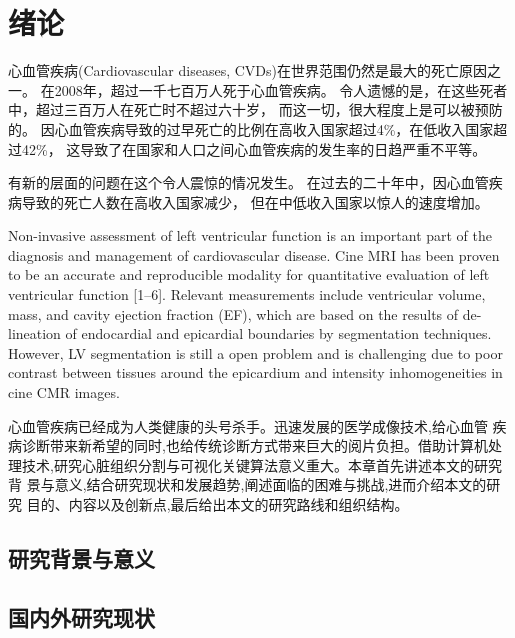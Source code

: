 
\chapter{绪论}
心血管疾病(Cardiovascular diseases, CVDs)在世界范围仍然是最大的死亡原因之一。
在2008年，超过一千七百万人死于心血管疾病。
令人遗憾的是，在这些死者中，超过三百万人在死亡时不超过六十岁，
而这一切，很大程度上是可以被预防的。
因心血管疾病导致的过早死亡的比例在高收入国家超过4\%，在低收入国家超过42\%，
这导致了在国家和人口之间心血管疾病的发生率的日趋严重不平等。

有新的层面的问题在这个令人震惊的情况发生。
在过去的二十年中，因心血管疾病导致的死亡人数在高收入国家减少，
但在中低收入国家以惊人的速度增加。

Non-invasive assessment of left ventricular function is an important part of the
diagnosis and management of cardiovascular disease. Cine MRI has been proven
to be an accurate and reproducible modality for quantitative evaluation of left
ventricular function [1–6]. Relevant measurements include ventricular volume,
mass, and cavity ejection fraction (EF), which are based on the results of de-
lineation of endocardial and epicardial boundaries by segmentation techniques.
However, LV segmentation is still a open problem and is challenging due to poor
contrast between tissues around the epicardium and intensity inhomogeneities
in cine CMR images.


心血管疾病已经成为人类健康的头号杀手。迅速发展的医学成像技术,给心血管
疾病诊断带来新希望的同时,也给传统诊断方式带来巨大的阅片负担。借助计算机处
理技术,研究心脏组织分割与可视化关键算法意义重大。本章首先讲述本文的研究背
景与意义,结合研究现状和发展趋势,阐述面临的困难与挑战,进而介绍本文的研究
目的、内容以及创新点,最后给出本文的研究路线和组织结构。

\section{研究背景与意义}


\section{国内外研究现状}

